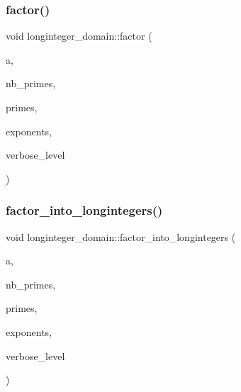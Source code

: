 \mbox{\label{classlonginteger__domain_a2224c4efabb173607589de9b5d91cad0}} 
\subsubsection{\texorpdfstring{factor()}{factor()}}
{\footnotesize\ttfamily void longinteger\+\_\+domain\+::factor (\begin{DoxyParamCaption}\item[{\mbox{\hyperlink{classlonginteger__object}{longinteger\+\_\+object}} \&}]{a,  }\item[{\mbox{\hyperlink{galois_8h_a09fddde158a3a20bd2dcadb609de11dc}{I\+NT}} \&}]{nb\+\_\+primes,  }\item[{\mbox{\hyperlink{galois_8h_a09fddde158a3a20bd2dcadb609de11dc}{I\+NT}} $\ast$\&}]{primes,  }\item[{\mbox{\hyperlink{galois_8h_a09fddde158a3a20bd2dcadb609de11dc}{I\+NT}} $\ast$\&}]{exponents,  }\item[{\mbox{\hyperlink{galois_8h_a09fddde158a3a20bd2dcadb609de11dc}{I\+NT}}}]{verbose\+\_\+level }\end{DoxyParamCaption})}

\mbox{\label{classlonginteger__domain_aba5c9b9b4a3286551fb3bc5e102e2b63}} 
\subsubsection{\texorpdfstring{factor\+\_\+into\+\_\+longintegers()}{factor\_into\_longintegers()}}
{\footnotesize\ttfamily void longinteger\+\_\+domain\+::factor\+\_\+into\+\_\+longintegers (\begin{DoxyParamCaption}\item[{\mbox{\hyperlink{classlonginteger__object}{longinteger\+\_\+object}} \&}]{a,  }\item[{\mbox{\hyperlink{galois_8h_a09fddde158a3a20bd2dcadb609de11dc}{I\+NT}} \&}]{nb\+\_\+primes,  }\item[{\mbox{\hyperlink{classlonginteger__object}{longinteger\+\_\+object}} $\ast$\&}]{primes,  }\item[{\mbox{\hyperlink{galois_8h_a09fddde158a3a20bd2dcadb609de11dc}{I\+NT}} $\ast$\&}]{exponents,  }\item[{\mbox{\hyperlink{galois_8h_a09fddde158a3a20bd2dcadb609de11dc}{I\+NT}}}]{verbose\+\_\+level }\end{DoxyParamCaption})}

